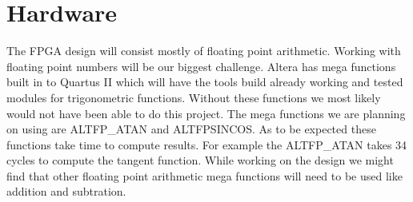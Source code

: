 \section{Hardware}

The FPGA design will consist mostly of floating point arithmetic. Working 
with floating point numbers will be our biggest challenge. Altera has 
mega functions built in to Quartus II which will have the tools build 
already working and tested modules for trigonometric functions. Without 
these functions we most likely would not have been able to do this project. 
The mega functions we are planning on using 
are ALTFP\_ATAN and ALTFPSINCOS. As to be expected these functions take 
time to compute results. For example the ALTFP\_ATAN takes 34 cycles to 
compute the tangent function. While working on the design we might find 
that other floating point arithmetic mega functions will need to be used 
like addition and subtration. 

